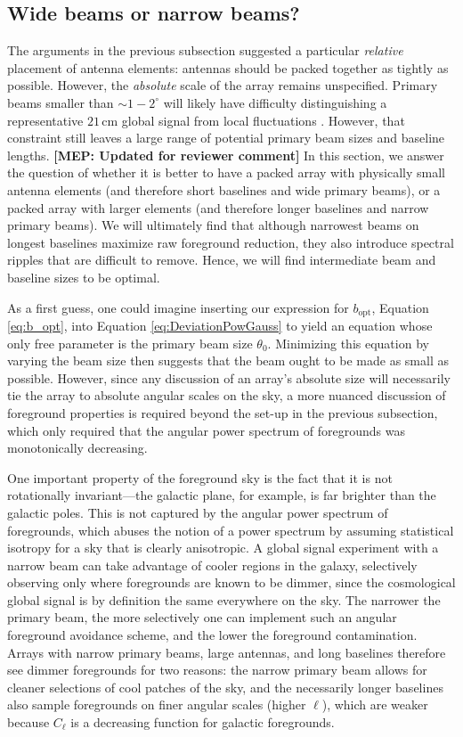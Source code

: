 \documentclass[twocolumn,apj,numberedappendix]{emulateapj}
\newcommand{\mep}[1]{{\color{applegreen} \textbf{[MEP:  #1]}}}
\begin{document}
\subsection{Wide beams or narrow beams?}
\label{sec:beamSize}

The arguments in the previous subsection suggested a particular \emph{relative} placement of antenna elements: antennas should be packed together as tightly as possible. However, the \emph{absolute} scale of the array remains unspecified. Primary beams smaller than $\sim1-2^\circ$ will likely have difficulty distinguishing a representative $21\,\textrm{cm}$ global signal from local fluctuations \citep{Bittner+Loeb2011}. However, that constraint still leaves a large range of potential primary beam sizes and baseline lengths. \mep{Updated for reviewer comment} In this section, we answer the question of whether it is better to have a packed array with physically small antenna elements (and therefore short baselines and wide primary beams), or a packed array with larger elements (and therefore longer baselines and narrow primary beams). We will ultimately find that although narrowest beams on longest baselines maximize raw foreground reduction, they also introduce spectral ripples that are difficult to remove. Hence, we will find intermediate beam and baseline sizes to be optimal.

As a first guess, one could imagine inserting our expression for $b_\textrm{opt}$, Equation \eqref{eq:b_opt}, into Equation \eqref{eq:DeviationPowGauss} to yield an equation whose only free parameter is the primary beam size $\theta_0$. Minimizing this equation by varying the beam size then suggests that the beam ought to be made as small as possible. However, since any discussion of an array's absolute size will necessarily tie the array to absolute angular scales on the sky, a more nuanced discussion of foreground properties is required beyond the set-up in the previous subsection, which only required that the angular power spectrum of foregrounds was monotonically decreasing.

One important property of the foreground sky is the fact that it is not rotationally invariant---the galactic plane, for example, is far brighter than the galactic poles. This is not captured by the angular power spectrum of foregrounds, which abuses the notion of a power spectrum by assuming statistical isotropy for a sky that is clearly anisotropic. A global signal experiment with a narrow beam can take advantage of cooler regions in the galaxy, selectively observing only where foregrounds are known to be dimmer, since the cosmological global signal is by definition the same everywhere on the sky. The narrower the primary beam, the more selectively one can implement such an angular foreground avoidance scheme, and the lower the foreground contamination. Arrays with narrow primary beams, large antennas, and long baselines therefore see dimmer foregrounds for two reasons: the narrow primary beam allows for cleaner selections of cool patches of the sky, and the necessarily longer baselines also sample foregrounds on finer angular scales (higher $\ell$), which are weaker because $C_\ell$ is a decreasing function for galactic foregrounds.
\end{document}
